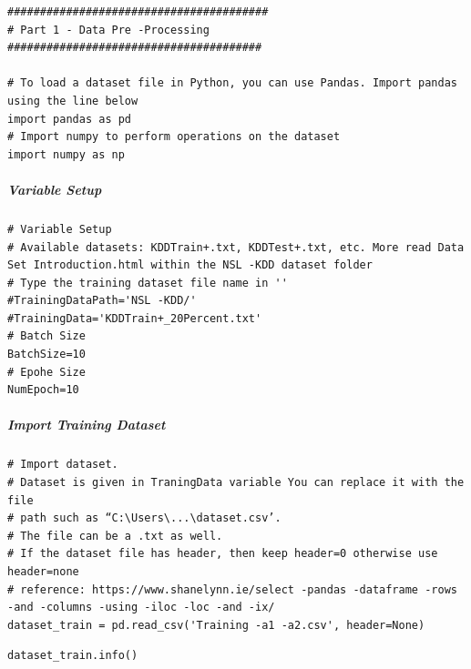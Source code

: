 \begin{verbatim}
########################################
# Part 1 - Data Pre -Processing
#######################################

# To load a dataset file in Python, you can use Pandas. Import pandas using the line below
import pandas as pd
# Import numpy to perform operations on the dataset
import numpy as np
\end{verbatim}

\subparagraph{Variable Setup}

\begin{verbatim}
# Variable Setup
# Available datasets: KDDTrain+.txt, KDDTest+.txt, etc. More read Data Set Introduction.html within the NSL -KDD dataset folder
# Type the training dataset file name in ''
#TrainingDataPath='NSL -KDD/'
#TrainingData='KDDTrain+_20Percent.txt'
# Batch Size
BatchSize=10
# Epohe Size
NumEpoch=10
\end{verbatim}

\subparagraph{Import Training Dataset}

\begin{verbatim}
# Import dataset.
# Dataset is given in TraningData variable You can replace it with the file 
# path such as “C:\Users\...\dataset.csv’. 
# The file can be a .txt as well. 
# If the dataset file has header, then keep header=0 otherwise use header=none
# reference: https://www.shanelynn.ie/select -pandas -dataframe -rows -and -columns -using -iloc -loc -and -ix/
dataset_train = pd.read_csv('Training -a1 -a2.csv', header=None)
\end{verbatim}

\begin{verbatim}
dataset_train.info()
\end{verbatim}

